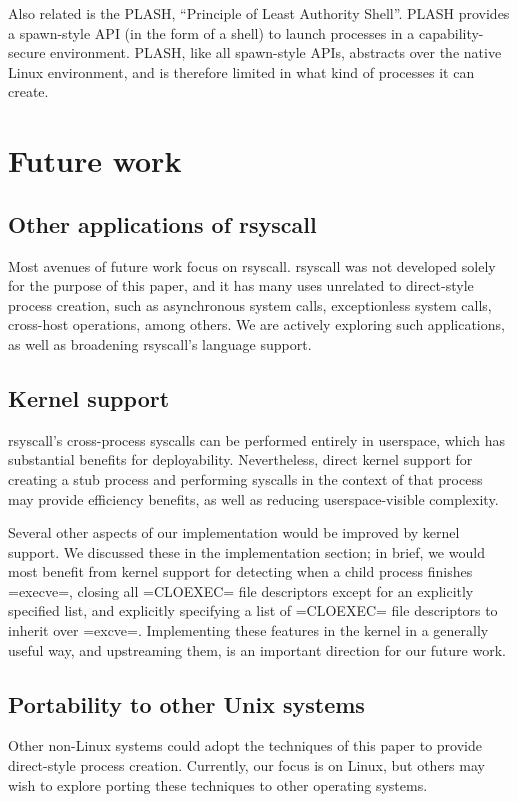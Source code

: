 \documentclass[sigplan]{acmart}
\begin{document}
Also related is the PLASH, ``Principle of Least Authority Shell''\cite{plash}.
PLASH provides a spawn-style API (in the form of a shell)
to launch processes in a capability-secure environment.
PLASH, like all spawn-style APIs, abstracts over the native Linux environment,
and is therefore limited in what kind of processes it can create.
\section{Future work}\label{future_work}
\subsection{Other applications of rsyscall}
Most avenues of future work focus on rsyscall.
rsyscall was not developed solely for the purpose of this paper,
and it has many uses unrelated to direct-style process creation,
such as asynchronous system calls, exceptionless system calls\cite{flexsc}, cross-host operations, among others.
We are actively exploring such applications,
as well as broadening rsyscall's language support.
\subsection{Kernel support}
rsyscall's cross-process syscalls can be performed entirely in userspace,
which has substantial benefits for deployability.
Nevertheless, direct kernel support for creating a stub process and performing syscalls in the context of that process
may provide efficiency benefits, as well as reducing userspace-visible complexity.

Several other aspects of our implementation would be improved by kernel support.
We discussed these in the implementation section;
in brief, we would most benefit from kernel support for
detecting when a child process finishes =execve=,
closing all =CLOEXEC= file descriptors except for an explicitly specified list,
and explicitly specifying a list of =CLOEXEC= file descriptors to inherit over =excve=.
Implementing these features in the kernel in a generally useful way, and upstreaming them,
is an important direction for our future work.
\subsection{Portability to other Unix systems}
Other non-Linux systems
could adopt the techniques of this paper
to provide direct-style process creation.
Currently, our focus is on Linux,
but others may wish to explore porting these techniques to other operating systems.
\end{document}
